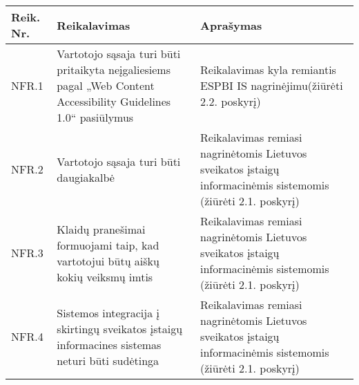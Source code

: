 

\begin{table}[!ht]
    \centering
    \renewcommand{\arraystretch}{1.2}
    \begin{tabular}{|m{3em}|m{17em}|m{17em}|}
    \hline 
    \rowcolor[HTML]{EFEFEF} 
    Reik. Nr. & Reikalavimas & Aprašymas \\ \hline
    
    NFR.1  &  Vartotojo sąsaja turi būti pritaikyta neįgaliesiems pagal „Web Content Accessibility Guidelines 1.0“ pasiūlymus  &  Reikalavimas kyla remiantis ESPBI IS nagrinėjimu(žiūrėti 2.2. poskyrį)       \\ \hline
    NFR.2  &  Vartotojo sąsaja turi būti daugiakalbė &  Reikalavimas remiasi nagrinėtomis Lietuvos sveikatos įstaigų informacinėmis sistemomis (žiūrėti 2.1. poskyrį)       \\ \hline
    NFR.3  & Klaidų pranešimai formuojami taip, kad vartotojui būtų aiškų kokių veiksmų imtis  &   Reikalavimas remiasi nagrinėtomis Lietuvos sveikatos įstaigų informacinėmis sistemomis (žiūrėti 2.1. poskyrį)       \\ \hline
    NFR.4  &  Sistemos integracija į skirtingų sveikatos įstaigų informacines sistemas neturi būti sudėtinga  &   Reikalavimas remiasi nagrinėtomis Lietuvos sveikatos įstaigų informacinėmis sistemomis (žiūrėti 2.1. poskyrį)       \\ \hline
    \end{tabular}
\end{table}

